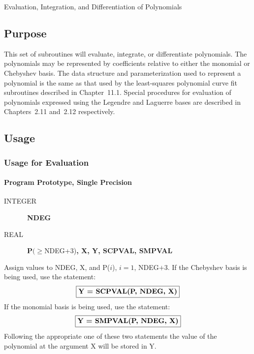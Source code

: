 \documentclass[twoside]{MATH77}
\begin{document}
 Evaluation, Integration, and Differentiation of Polynomials


\subsection{Purpose}

This set of subroutines will evaluate, integrate, or differentiate
polynomials. The polynomials may be represented by coefficients relative to
either the monomial or Chebyshev basis. The data structure and
parameterization used to represent a polynomial is the same as that used by
the least-squares polynomial curve fit subroutines described in Chapter~11.1.
Special procedures for evaluation of polynomials expressed using the
Legendre and Laguerre bases are described in Chapters~2.11 and~2.12
respectively.

\subsection{Usage}

\subsubsection{Usage for Evaluation}

\paragraph{Program Prototype, Single Precision}
\begin{description}
\item[INTEGER]  \ {\bf NDEG}

\item[REAL]  \ {\bf P}$(\geq $NDEG+3){\bf , X, Y, SCPVAL, SMPVAL}
\end{description}
Assign values to NDEG, X, and P($i$), $i = 1$, NDEG$+3$. If the Chebyshev
basis is being used, use the statement:
$$
\fbox{{\bf Y = SCPVAL(P, NDEG, X)}}
$$
If the monomial basis is being used, use the statement:
$$
\fbox{{\bf Y = SMPVAL(P, NDEG, X)}}
$$
Following the appropriate one of these two statements the value of the
polynomial at the argument X will be stored in Y.
\end{document}
